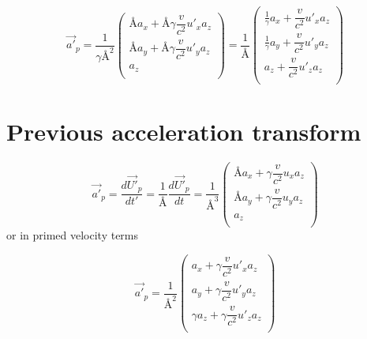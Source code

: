 \begin{equation}%
    \Vec{a'}_p=  \dfrac{1}{\gamma\text{\AA}^2 }\begin{pmatrix}
    \text{\AA} a_x + \text{\AA}\gamma \dfrac{v}{c^2} u'_x a_z \\
    \text{\AA} a_y + \text{\AA}\gamma \dfrac{v}{c^2} u'_y a_z  \\
     a_z \\
    \end{pmatrix}
    =  \dfrac{1}{\text{\AA} }\begin{pmatrix}
     \frac{1}{\gamma} a_x +  \dfrac{v}{c^2} u'_x a_z \\
     \frac{1}{\gamma} a_y +  \dfrac{v}{c^2} u'_y a_z  \\
     a_z +  \dfrac{v}{c^2} u'_z a_z\\
    \end{pmatrix}
\end{equation}%

\section{Previous acceleration transform}

\begin{equation}%
    \Vec{a'}_p = \dfrac{d\Vec{U'}_p}{dt'} = \dfrac{1}{\text{\AA}}\dfrac{d\Vec{U'}_p}{dt} = \dfrac{1}{\text{\AA}^3} \begin{pmatrix}
    \text{\AA} a_x + \gamma\dfrac{v}{c^2} u_x a_z \\ 
    \text{\AA} a_y + \gamma\dfrac{v}{c^2} u_y a_z  \\ 
    a_z \\
    \end{pmatrix}
\end{equation}%
or in primed velocity terms

\begin{equation}%
    \Vec{a'}_p = \dfrac{1}{\text{\AA}^2} \begin{pmatrix}
    a_x + \gamma\dfrac{v}{c^2} u'_x a_z \\ 
    a_y + \gamma\dfrac{v}{c^2} u'_y a_z  \\ 
    \gamma a_z + \gamma\dfrac{v}{c^2} u'_z a_z\\
    \end{pmatrix}
\end{equation}%

